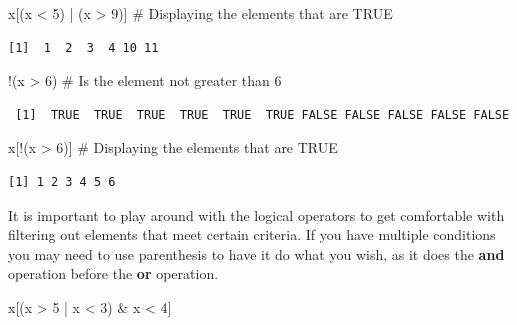 \documentclass[
  letterpaper,
  DIV=11,
  numbers=noendperiod]{scrreprt}
\newenvironment{Shaded}{\begin{snugshade}}{\end{snugshade}}
\newcommand{\CommentTok}[1]{\textcolor[rgb]{0.37,0.37,0.37}{#1}}
\newcommand{\DecValTok}[1]{\textcolor[rgb]{0.68,0.00,0.00}{#1}}
\newcommand{\NormalTok}[1]{\textcolor[rgb]{0.00,0.23,0.31}{#1}}
\newcommand{\SpecialCharTok}[1]{\textcolor[rgb]{0.37,0.37,0.37}{#1}}
\begin{document}
\begin{Shaded}
\begin{Highlighting}[]
\NormalTok{x[(x }\SpecialCharTok{\textless{}} \DecValTok{5}\NormalTok{) }\SpecialCharTok{|}\NormalTok{ (x }\SpecialCharTok{\textgreater{}} \DecValTok{9}\NormalTok{)] }\CommentTok{\# Displaying the elements that are TRUE}
\end{Highlighting}
\end{Shaded}

\begin{verbatim}
[1]  1  2  3  4 10 11
\end{verbatim}

\begin{Shaded}
\begin{Highlighting}[]
\SpecialCharTok{!}\NormalTok{(x }\SpecialCharTok{\textgreater{}} \DecValTok{6}\NormalTok{) }\CommentTok{\# Is the element not greater than 6}
\end{Highlighting}
\end{Shaded}

\begin{verbatim}
 [1]  TRUE  TRUE  TRUE  TRUE  TRUE  TRUE FALSE FALSE FALSE FALSE FALSE
\end{verbatim}

\begin{Shaded}
\begin{Highlighting}[]
\NormalTok{x[}\SpecialCharTok{!}\NormalTok{(x }\SpecialCharTok{\textgreater{}} \DecValTok{6}\NormalTok{)] }\CommentTok{\# Displaying the elements that are TRUE}
\end{Highlighting}
\end{Shaded}

\begin{verbatim}
[1] 1 2 3 4 5 6
\end{verbatim}

It is important to play around with the logical operators to get
comfortable with filtering out elements that meet certain criteria. If
you have multiple conditions you may need to use parenthesis to have it
do what you wish, as it does the \textbf{and} operation before the
\textbf{or} operation.

\begin{Shaded}
\begin{Highlighting}[]
\NormalTok{x[(x }\SpecialCharTok{\textgreater{}} \DecValTok{5} \SpecialCharTok{|}\NormalTok{ x }\SpecialCharTok{\textless{}} \DecValTok{3}\NormalTok{) }\SpecialCharTok{\&}\NormalTok{ x }\SpecialCharTok{\textless{}} \DecValTok{4}\NormalTok{] }
\end{Highlighting}
\end{Shaded}
\end{document}
